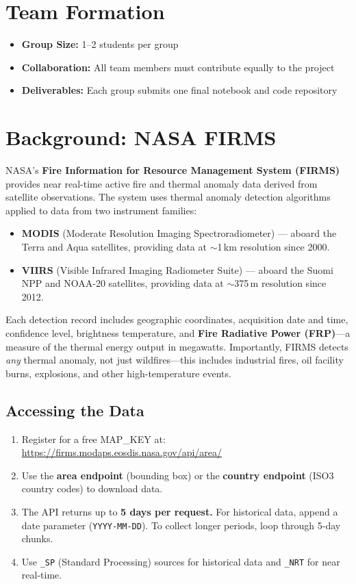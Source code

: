 \documentclass[11pt]{article}
\begin{document}
\section{Team Formation}
\begin{itemize}
  \item \textbf{Group Size:} 1--2 students per group
  \item \textbf{Collaboration:} All team members must contribute equally to the project
  \item \textbf{Deliverables:} Each group submits one final notebook and code repository
\end{itemize}

\section{Background: NASA FIRMS}

NASA's \textbf{Fire Information for Resource Management System (FIRMS)} provides near real-time active fire and thermal anomaly data derived from satellite observations. The system uses thermal anomaly detection algorithms applied to data from two instrument families:
\begin{itemize}
  \item \textbf{MODIS} (Moderate Resolution Imaging Spectroradiometer) --- aboard the Terra and Aqua satellites, providing data at $\sim$1\,km resolution since 2000.
  \item \textbf{VIIRS} (Visible Infrared Imaging Radiometer Suite) --- aboard the Suomi NPP and NOAA-20 satellites, providing data at $\sim$375\,m resolution since 2012.
\end{itemize}

Each detection record includes geographic coordinates, acquisition date and time, confidence level, brightness temperature, and \textbf{Fire Radiative Power (FRP)}---a measure of the thermal energy output in megawatts. Importantly, FIRMS detects \emph{any} thermal anomaly, not just wildfires---this includes industrial fires, oil facility burns, explosions, and other high-temperature events.

\subsection{Accessing the Data}
\begin{enumerate}
  \item Register for a free MAP\_KEY at: \url{https://firms.modaps.eosdis.nasa.gov/api/area/}
  \item Use the \textbf{area endpoint} (bounding box) or the \textbf{country endpoint} (ISO3 country codes) to download data.
  \item The API returns up to \textbf{5 days per request.} For historical data, append a date parameter (\texttt{YYYY-MM-DD}). To collect longer periods, loop through 5-day chunks.
  \item Use \texttt{\_SP} (Standard Processing) sources for historical data and \texttt{\_NRT} for near real-time.
\end{enumerate}
\end{document}
